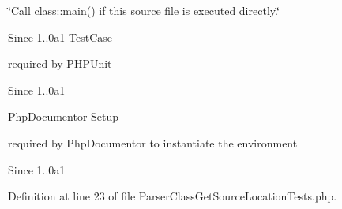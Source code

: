 \char`\"{}\-Call class\-::main() if this source file is executed directly.\char`\"{} \begin{DoxySince}{\-Since}
1..\-0a1 \-Test\-Case
\end{DoxySince}
required by \-P\-H\-P\-Unit \begin{DoxySince}{\-Since}
1..\-0a1
\end{DoxySince}
\-Php\-Documentor \-Setup

required by \-Php\-Documentor to instantiate the environment \begin{DoxySince}{\-Since}
1..\-0a1 
\end{DoxySince}


\-Definition at line 23 of file \-Parser\-Class\-Get\-Source\-Location\-Tests.\-php.

